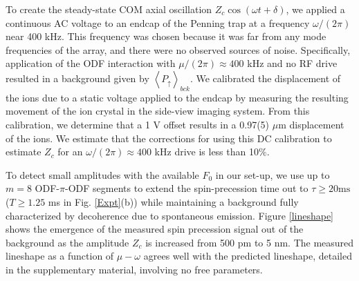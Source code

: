 \documentclass[aps,prl,twocolumn,superscriptaddress,floatfix,nofootinbib]{revtex4-1}
\begin{document}
To create the steady-state COM axial oscillation $Z_c \cos(\omega t+\delta)$, we applied a continuous AC voltage to an endcap of the Penning trap at a frequency $\omega/(2\pi)$ near 400 kHz. This frequency was chosen because it was far from any mode frequencies of the array, and there were no observed sources of noise. Specifically, application of the ODF interaction with $\mu/(2\pi) \approx 400$ kHz and no RF drive resulted in a background given by $\left\langle P_{\uparrow}\right\rangle _{bck}$. We calibrated the displacement of the ions due to a static voltage applied to the endcap by measuring the resulting movement of the ion crystal in the side-view imaging system. From this calibration, we determine that a 1 V offset results in a 0.97(5) $\mu$m displacement of the ions. We estimate that the corrections for using this DC calibration to estimate $Z_c$ for an $\omega/(2\pi) \approx 400$ kHz drive is less than 10$\%$.


To detect small amplitudes with the available $F_0$ in our set-up, we use up to $m = 8$ ODF-$\pi$-ODF segments to extend the spin-precession time out to $\tau \ge 20 \mathrm{ms}$ ($T \ge 1.25$ ms in Fig. \ref{Expt}(b)) while maintaining a background fully characterized by decoherence due to spontaneous emission. Figure \ref{lineshape} shows the emergence of the measured spin precession signal out of the background as the amplitude $Z_c$ is increased from 500 pm to 5 nm. The measured lineshape as a function of $\mu-\omega$ agrees well with the predicted lineshape, detailed in the supplementary material, involving no free parameters.
\end{document}
